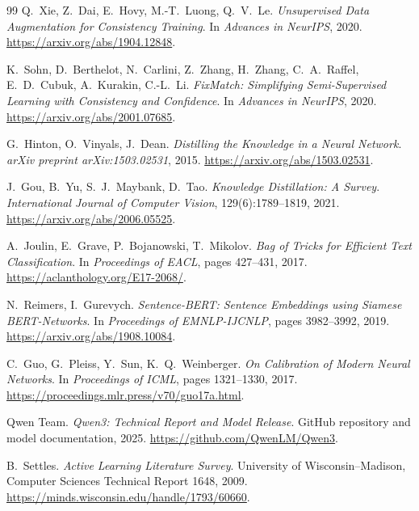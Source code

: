 \documentclass[11pt,a4paper]{article}
\begin{document}
\begin{thebibliography}{99}
Q.~Xie, Z.~Dai, E.~Hovy, M.-T.~Luong, Q.~V.~Le.
\newblock \emph{Unsupervised Data Augmentation for Consistency Training}.
\newblock In \emph{Advances in NeurIPS}, 2020.
\newblock \url{https://arxiv.org/abs/1904.12848}.

K.~Sohn, D.~Berthelot, N.~Carlini, Z.~Zhang, H.~Zhang, C.~A.~Raffel,
E.~D.~Cubuk, A.~Kurakin, C.-L.~Li.
\newblock \emph{FixMatch: Simplifying Semi-Supervised Learning with Consistency and Confidence}.
\newblock In \emph{Advances in NeurIPS}, 2020.
\newblock \url{https://arxiv.org/abs/2001.07685}.

G.~Hinton, O.~Vinyals, J.~Dean.
\newblock \emph{Distilling the Knowledge in a Neural Network}.
\newblock \emph{arXiv preprint arXiv:1503.02531}, 2015.
\newblock \url{https://arxiv.org/abs/1503.02531}.

J.~Gou, B.~Yu, S.~J.~Maybank, D.~Tao.
\newblock \emph{Knowledge Distillation: A Survey}.
\newblock \emph{International Journal of Computer Vision}, 129(6):1789--1819, 2021.
\newblock \url{https://arxiv.org/abs/2006.05525}.

A.~Joulin, E.~Grave, P.~Bojanowski, T.~Mikolov.
\newblock \emph{Bag of Tricks for Efficient Text Classification}.
\newblock In \emph{Proceedings of EACL}, pages 427--431, 2017.
\newblock \url{https://aclanthology.org/E17-2068/}.

N.~Reimers, I.~Gurevych.
\newblock \emph{Sentence-BERT: Sentence Embeddings using Siamese BERT-Networks}.
\newblock In \emph{Proceedings of EMNLP-IJCNLP}, pages 3982--3992, 2019.
\newblock \url{https://arxiv.org/abs/1908.10084}.

C.~Guo, G.~Pleiss, Y.~Sun, K.~Q.~Weinberger.
\newblock \emph{On Calibration of Modern Neural Networks}.
\newblock In \emph{Proceedings of ICML}, pages 1321--1330, 2017.
\newblock \url{https://proceedings.mlr.press/v70/guo17a.html}.

Qwen Team.
\newblock \emph{Qwen3: Technical Report and Model Release}.
\newblock GitHub repository and model documentation, 2025.
\newblock \url{https://github.com/QwenLM/Qwen3}.

B.~Settles.
\newblock \emph{Active Learning Literature Survey}.
\newblock University of Wisconsin--Madison, Computer Sciences Technical
Report 1648, 2009.
\newblock \url{https://minds.wisconsin.edu/handle/1793/60660}.


\end{thebibliography}
\end{document}

